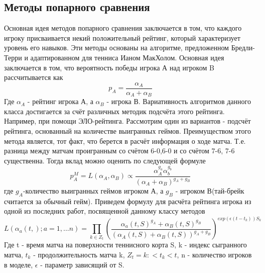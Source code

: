 \subsection{Методы попарного сравнения}
Основная идея методов попарного сравнения заключается в том, что каждого игроку присваивается некий положительный рейтинг, который характеризует уровень его навыков. Эти методы основаны на алгоритме, предложенном Бредли-Терри\cite{Book17} и адаптированном для тенниса Ианом МакХолом\cite{Book18}.
Основная идея заключается в том, что вероятность победы игрока А над игроком B рассчитывается как
\begin{equation}
p_A=\frac{\alpha_A}{\alpha_A + \alpha_B}\label{eq2}
\end{equation}
Где $\alpha_A$ - рейтинг игрока А, а $\alpha_B$ - игрока В. Вариативность алгоритмов данного класса достигается за счёт различных методик подсчёта этого рейтинга. Например, при помощи ЭЛО-рейтинга\cite{Book24}. Рассмотрим один из вариантов - подсчёт рейтинга, основанный на количестве выигранных геймов. Преимуществом этого метода является, тот факт, что берется в расчёт информация о ходе матча. Т.е. разница между матчам проигранным со счётом 6-0,6-0 и со счётом 7-6, 7-6 существенна.
Тогда вклад можно оценить по следующей формуле
\begin{equation}
p^M_A=L(\alpha_A,\alpha_B) ∝\frac{\alpha_A^{g_a}\alpha_b^{g_b}}{(\alpha_A + \alpha_B)^{g_A + g_B}}
\end{equation} 
где $g_A$-количество выигранных геймов игроком А, а $g_B$ -  игроком В(тай-брейк  считается за обычный гейм).
Приведем формулу для расчёта рейтинга игрока из одной из последних работ, посвященной данному классу методов
\begin{equation}
L(\alpha_a(t,); a=1,...n) = \prod_{k\in Z_t}(\frac{\alpha_a(t,S)^{g_A} + \alpha_B(t,S)^{g_B}}{(\alpha_A(t,S) + \alpha_B(t,S))^{g_A + g_B}})^{exp(\epsilon( t-t_k))S_k}
\end{equation}
Где t - время матча на поверхности теннисного корта S, k - индекс сыгранного матча, $t_k$ - продолжительность матча k, $Z_t={k : < t_k < t}$, n - количество игроков в моделе, $\epsilon$ - параметр зависящий от S.

